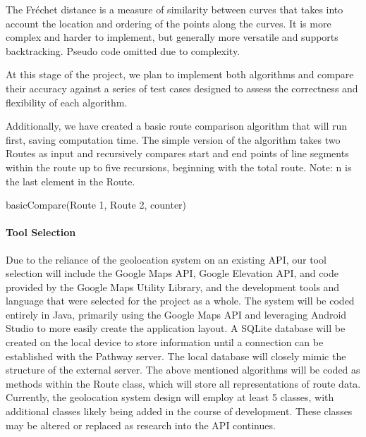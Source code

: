 ﻿\documentclass{article}
\begin{document}
The Fréchet distance is a measure of similarity between curves that takes into account the location and ordering of the points along the curves.\cite{g_frechet} It is more complex and harder to implement, but generally more versatile and supports backtracking. Pseudo code omitted due to complexity.

At this stage of the project, we plan to implement both algorithms and compare their accuracy against a series of test cases designed to assess the correctness and flexibility of each algorithm.

Additionally, we have created a basic route comparison algorithm that will run first, saving computation time. The simple version of the algorithm takes two Routes as input and recursively compares start and end points of line segments within the route up to five recursions, beginning with the total route.
\newline Note: n is the last element in the Route.\newline

\begin{algorithm}[H]
\SetAlgoLined
{}
\caption{basicCompare(Route 1, Route 2, counter)}
\end{algorithm}

\pagebreak
\paragraph{Tool Selection}
Due to the reliance of the geolocation system on an existing API, our tool selection will include the Google Maps API\cite{G_API_Maps}, Google Elevation API\cite{g_API_Elev}, and code provided by the Google Maps Utility Library\cite{g_Util_Map}, and the development tools and language that were selected for the project as a whole. The system will be coded entirely in Java, primarily using the Google Maps API and leveraging Android Studio to more easily create the application layout. A SQLite database will be created on the local device to store information until a connection can be established with the Pathway server. The local database will closely mimic the structure of the external server. The above mentioned algorithms will be coded as methods within the Route class, which will store all representations of route data. Currently, the geolocation system design will employ at least 5 classes, with additional classes likely being added in the course of development. These classes may be altered or replaced as research into the API continues.
\end{document}
